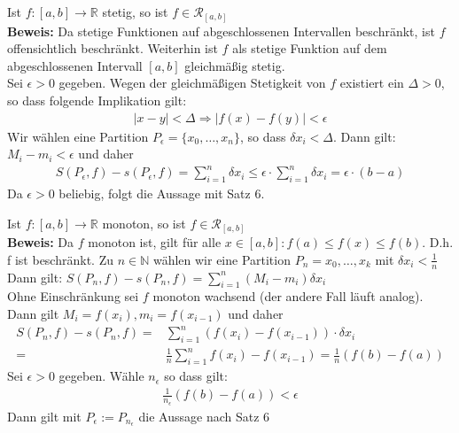 \begin{Satz}{
	Ist $f: [a,b] \rightarrow \mathbb{R}$ stetig, so ist 
	$ f \in \mathcal{R}_{[a,b]}$ \\
	\textbf{Beweis:} Da stetige Funktionen auf abgeschlossenen Intervallen 
	beschränkt, ist $f$ offensichtlich beschränkt. Weiterhin ist $f$ als stetige 
	Funktion auf dem abgeschlossenen Intervall $[a,b]$ gleichmäßig stetig. \\
	Sei $\epsilon > 0 $ gegeben. Wegen der gleichmäßigen Stetigkeit von $f$ 
	existiert ein $\Delta > 0$, so dass folgende Implikation gilt:
	\begin{align*}
		\vert x - y \vert < \Delta \Rightarrow \vert f(x) -f(y) \vert < \epsilon
	\end{align*}
	Wir wählen eine Partition $P_{\epsilon} = \{ x_0, \hdots, x_n \}$, so dass 
	$\delta x_i < \Delta$. Dann gilt: $M_i - m_i < \epsilon$ und daher
	\begin{align*}
		S(P_{\epsilon},f) - s(P_{\epsilon},f) = \sum_{i = 1}^n \delta x_i 
		\leq \epsilon \cdot \sum_{i = 1}^n \delta x_i = \epsilon \cdot (b-a)
	\end{align*}
	Da $\epsilon > 0$ beliebig, folgt die Aussage mit Satz 6. %
}\end{Satz}

\begin{Satz}{
	Ist $f: [a,b] \rightarrow \mathbb{R}$ monoton, so ist $f \in \mathcal{R}_{[a,b]}
	$\\
	\textbf{Beweis:} Da $f$ monoton ist, gilt für alle $x \in [a,b]: f(a) \leq f(x) 
	\leq f(b)$. D.h. f ist beschränkt. Zu $n \in \mathbb{N}$ wählen wir eine 
	Partition $P_n = {x_0, \hdots, x_k}$ mit $\delta x_i < \frac{1}{n}$\\
	Dann gilt: $S(P_n, f) - s(P_n,f) = \sum_{i=1}^n (M_i - m_i)\delta x_i$ \\
	Ohne Einschränkung sei $f$ monoton wachsend (der andere Fall läuft analog). \\
	Dann gilt $M_i = f(x_i), m_i = f(x_{i-1})$ und daher 
	\begin{align*}
		S(P_n, f) - s(P_n,f) = & \sum_{i=1}^n (f(x_i) -f(x_{i-1}))\cdot \delta x_i 
		\\ = & \frac{1}{	n}\sum_{i=1}^n f(x_i) -f(x_{i-1}) = 
		\frac{1}{n} (f(b) -f(a)) 
	\end{align*}
	Sei $\epsilon > 0$ gegeben. Wähle $n_{\epsilon}$ so dass gilt:
	\begin{align*}
		\frac{1}{n_{\epsilon}}(f(b) -f(a)) < \epsilon
	\end{align*}
	Dann gilt mit $P_{\epsilon} := P_{n_{\epsilon}}$ die Aussage nach Satz 6 
}\end{Satz}

